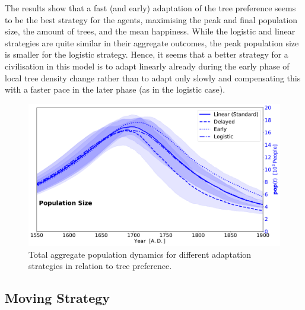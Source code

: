 The results show that a fast (and early) adaptation of the tree preference seems to be the best strategy for the agents, maximising the peak and final population size, the amount of trees, and the mean happiness.
While the logistic and linear strategies are quite similar in their aggregate outcomes, the peak population size is smaller for the logistic strategy.
Hence, it seems that a better strategy for a civilisation in this model is to adapt linearly already during the early phase of local tree density change rather than to adapt only slowly and compensating this with a faster pace in the later phase (as in the logistic case).
\begin{figure}
	\centering
	\includegraphics[width=1\linewidth]{images/Results/TPref/TPrefAdaption_Population_Size}
	\caption{Total aggregate population dynamics for different adaptation strategies in relation to tree preference.}
	\label{fig:tprefadaptionpopulationsize}
\end{figure}


\subsection{Moving Strategy}
